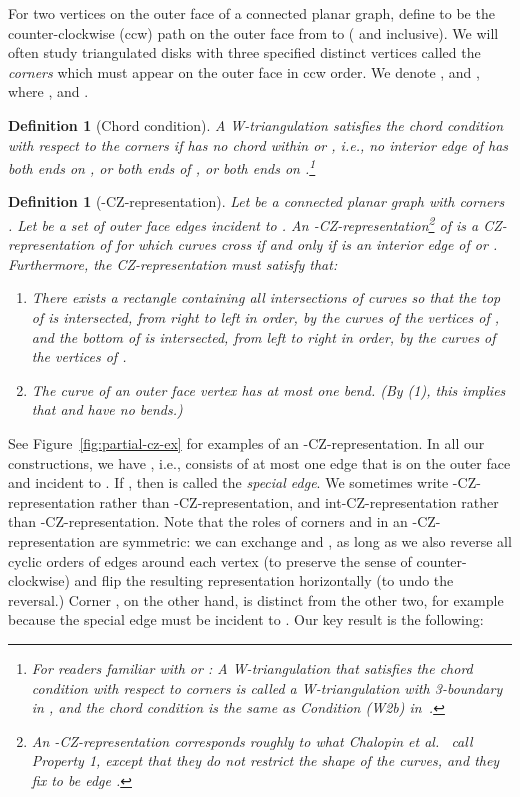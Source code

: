 \documentclass{article}
\renewcommand{\int}[1]{}
\newtheorem{definition}[theorem]{Definition}
\begin{document}
For two vertices  on the outer face of a connected planar graph,
define  to be the counter-clockwise (ccw) path on the outer face from  to  ( and  inclusive).
We will often study triangulated disks with
three specified distinct vertices  called the {\em corners}
which must appear on the outer face in ccw order. 
We denote ,  
and , where ,  
and . 

\begin{definition}[Chord condition]
\label{def:chord-condition}
A W-triangulation  satisfies the \emph{chord condition} with respect
to the corners  if  has no chord within  or ,
i.e., no interior edge of  has 
both ends on , or both ends of , or
both ends on .\footnote{For readers familiar with \cite{cit:chalopin-string}
or \cite{cit:ham-cycle}:
A W-triangulation that satisfies the chord condition with respect
to corners  is called a \emph{W-triangulation 
with 3-boundary } 
in \cite{cit:chalopin-string},
and the chord condition is 
the same as \emph{Condition (W2b)} in~\cite{cit:ham-cycle}.}\end{definition}


\begin{definition}[\int{F}-CZ-representation]
Let  be a connected planar graph with corners . 
Let  be a set of outer face edges incident to .
An \emph{\int{F}-CZ-representation}\footnote{An \int{F}-CZ-representation corresponds roughly to what Chalopin
et al.~\cite{cit:chalopin-string} call Property 1, except that they do not
restrict the shape of the curves, and they fix  to be edge .}
of  is a CZ-representation of  for which curves  cross if and
only if  is an interior edge of  or . 
Furthermore, the CZ-representation must satisfy that:
\begin{enumerate}
    \item There exists a rectangle  containing all intersections 
    of curves so that the top of  is intersected, from right to 
	left in order, by the curves of the vertices of , 
and the bottom
    of  is intersected, from left to right in order, 
by the curves of the vertices of . 
    \item The curve  of an outer face vertex  has at most one
    bend. (By (1), this implies that  and  have no bends.)
\end{enumerate}
\end{definition}


See Figure~\ref{fig:partial-cz-ex} for examples of an \int{F}-CZ-representation.
In all our constructions, we have , i.e.,  consists of
at most one edge that is on the outer face and incident to .
If , then  is called the \emph{special edge}.
We sometimes write \int{e}-CZ-representation rather than 
\int{\{e\}}-CZ-representation, and
int-CZ-representation rather than
\int{\emptyset}-CZ-representation.
Note that the roles of corners  and  in an \int{F}-CZ-representation 
are symmetric: we can exchange  and , as long as we also reverse
all cyclic orders of edges around each vertex (to preserve the sense
of counter-clockwise) and flip the resulting representation horizontally
(to undo the reversal.)
Corner , on the other hand, is distinct from the other two, for 
example because the special edge must be incident to . 
Our key result is the following:
\end{document}

